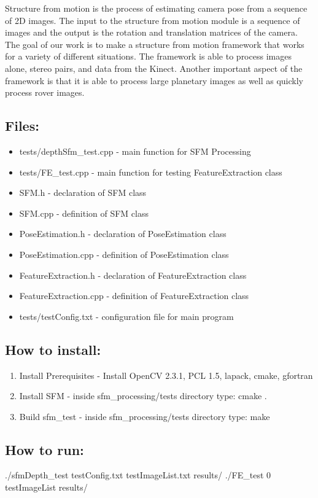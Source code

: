 Structure from motion is the process of estimating camera pose from a sequence of 2D images. The input to the structure from motion module is a sequence of images and the output is the rotation and translation matrices of the camera. The goal of our work is to make a structure from motion framework that works for a variety of different situations. The framework is able to process images alone, stereo pairs, and data from the Kinect. Another important aspect of the framework is that it is able to process large planetary images as well as quickly process rover images.

\subsection{Files:}
\begin{itemize}
	\item{tests/depthSfm\_test.cpp} - main function for SFM Processing
	\item{tests/FE\_test.cpp} - main function for testing FeatureExtraction class
	\item{SFM.h} - declaration of SFM class
	\item{SFM.cpp} - definition of SFM class
	\item{PoseEstimation.h} - declaration of PoseEstimation class
	\item{PoseEstimation.cpp} - definition of PoseEstimation class
	\item{FeatureExtraction.h} - declaration of FeatureExtraction class
	\item{FeatureExtraction.cpp} - definition of FeatureExtraction class
	\item{tests/testConfig.txt} - configuration file for main program
\end{itemize}


\subsection{How to install:}
\begin{enumerate}
	\item{Install Prerequisites} - Install OpenCV 2.3.1, PCL 1.5, lapack, cmake, gfortran
	\item{Install SFM} - inside sfm\_processing/tests directory type: cmake .
	\item{Build sfm\_test} - inside sfm\_processing/tests directory type: make
\end{enumerate}

\subsection{How to run:}
./sfmDepth\_test testConfig.txt testImageList.txt results/
./FE\_test 0 testImageList results/
